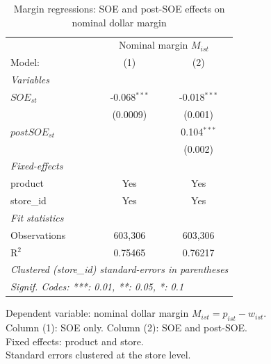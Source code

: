 
\begin{table}[htbp]
   \caption{\label{tab:margin_reg} Margin regressions: SOE and post-SOE effects on nominal dollar margin}
   \centering
   \begin{tabular}{lcc}
      \tabularnewline \midrule \midrule
       & \multicolumn{2}{c}{Nominal margin $M_{ist}$} \\ 
      Model:         & (1)            & (2)\\  
      \midrule
      \emph{Variables}\\
      $SOE_{st}$     & -0.068$^{***}$ & -0.018$^{***}$\\   
                     & (0.0009)       & (0.001)\\   
      $postSOE_{st}$ &                & 0.104$^{***}$\\   
                     &                & (0.002)\\   
      \midrule
      \emph{Fixed-effects}\\
      product        & Yes            & Yes\\  
      store\_id      & Yes            & Yes\\  
      \midrule
      \emph{Fit statistics}\\
      Observations   & 603,306        & 603,306\\  
      R$^2$          & 0.75465        & 0.76217\\  
      \midrule \midrule
      \multicolumn{3}{l}{\emph{Clustered (store\_id) standard-errors in parentheses}}\\
      \multicolumn{3}{l}{\emph{Signif. Codes: ***: 0.01, **: 0.05, *: 0.1}}\\
   \end{tabular}
   
   \par \raggedright 
   Dependent variable: nominal dollar margin $M_{ist} = p_{ist} - w_{ist}$.\\
   Column (1): SOE only. Column (2): SOE and post-SOE.\\
   Fixed effects: product and store.\\
   Standard errors clustered at the store level.
\end{table}


